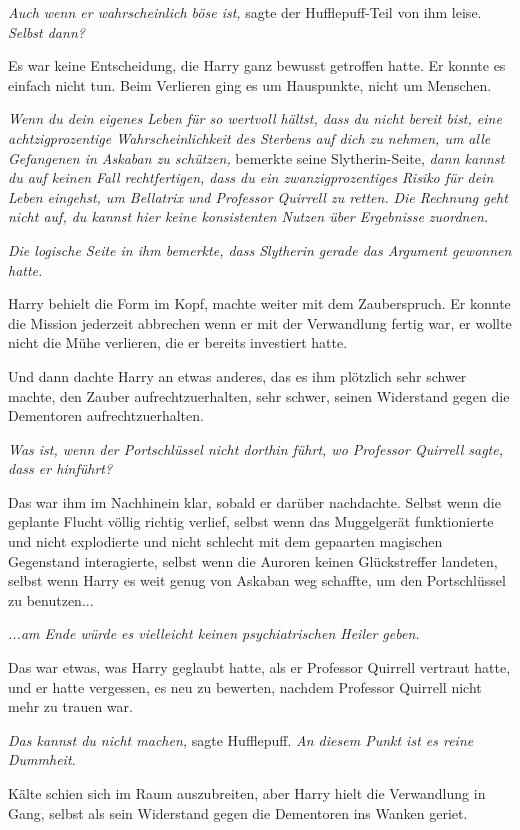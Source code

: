 {\emph{Auch wenn er wahrscheinlich böse ist,} sagte der Hufflepuff-Teil von ihm leise. \emph{Selbst dann?}

Es war keine Entscheidung, die Harry ganz bewusst getroffen hatte. Er konnte es einfach nicht tun. Beim Verlieren ging es um Hauspunkte, nicht um Menschen.

\emph{Wenn du dein eigenes Leben für so wertvoll hältst, dass du nicht bereit bist, eine achtzigprozentige Wahrscheinlichkeit des Sterbens auf dich zu nehmen, um alle Gefangenen in Askaban zu schützen,} bemerkte seine Slytherin-Seite, \emph{dann kannst du auf keinen Fall rechtfertigen, dass du ein zwanzigprozentiges Risiko für dein Leben eingehst, um Bellatrix und Professor Quirrell zu retten.} \emph{Die Rechnung geht nicht auf, du kannst hier keine konsistenten Nutzen über Ergebnisse zuordnen.}

\emph{Die logische Seite in ihm bemerkte, dass Slytherin gerade das Argument gewonnen hatte.}

Harry behielt die Form im Kopf, machte weiter mit dem Zauberspruch. Er konnte die Mission jederzeit abbrechen wenn er mit der Verwandlung fertig war, er wollte nicht die Mühe verlieren, die er bereits investiert hatte.

Und dann dachte Harry an etwas anderes, das es ihm plötzlich sehr schwer machte, den Zauber aufrechtzuerhalten, sehr schwer, seinen Widerstand gegen die Dementoren aufrechtzuerhalten.

\emph{Was ist, wenn der Portschlüssel nicht dorthin führt, wo Professor Quirrell sagte, dass er hinführt?}

Das war ihm im Nachhinein klar, sobald er darüber nachdachte. Selbst wenn die geplante Flucht völlig richtig verlief, selbst wenn das Muggelgerät funktionierte und nicht explodierte und nicht schlecht mit dem gepaarten magischen Gegenstand interagierte, selbst wenn die Auroren keinen Glückstreffer landeten, selbst wenn Harry es weit genug von Askaban weg schaffte, um den Portschlüssel zu benutzen...

\emph{...am Ende würde es vielleicht keinen psychiatrischen Heiler geben.}

Das war etwas, was Harry geglaubt hatte, als er Professor Quirrell vertraut hatte, und er hatte vergessen, es neu zu bewerten, nachdem Professor Quirrell nicht mehr zu trauen war.

\emph{Das kannst du nicht machen,} sagte Hufflepuff. \emph{An diesem Punkt ist es reine Dummheit.}

Kälte schien sich im Raum auszubreiten, aber Harry hielt die Verwandlung in Gang, selbst als sein Widerstand gegen die Dementoren ins Wanken geriet.

}
